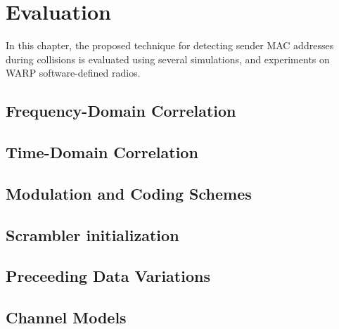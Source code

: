 
\chapter{Evaluation}\label{ch:evaluation}
\glsresetall %

In this chapter, the proposed technique for detecting sender MAC addresses during collisions is evaluated using several simulations, and experiments on WARP software-defined radios.



\section{Frequency-Domain Correlation}



\section{Time-Domain Correlation}\label{sec:freq-correlation}



\section{Modulation and Coding Schemes}



\section{Scrambler initialization}



\section{Preceeding Data Variations}



\section{Channel Models}

